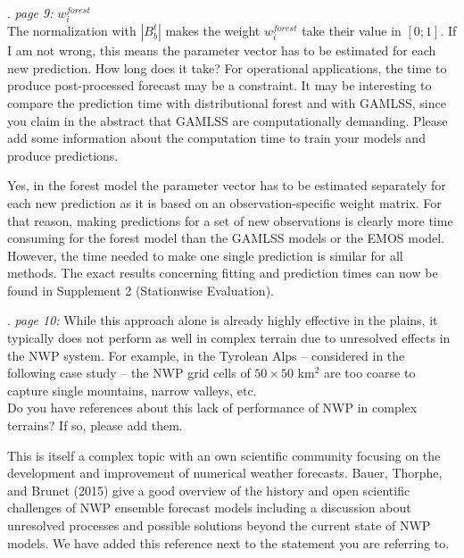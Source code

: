 \documentclass[american,foldmarks=false,noconfig]{uibklttr}
\newenvironment{review}{\fontshape{\itdefault}\fontseries{\bfdefault} \selectfont \smallskip}{\par}
\begin{document}
\begin{review}
10. {\color{quotecolor}\textit{page 9:} $w_i^{forest}$}\\
The normalization with $|B_b^t|$ makes the weight $w_i^{forest}$ 
take their value in $[0; 1]$. If I am not wrong, this means the 
parameter vector has to be estimated for each new prediction. 
How long does it take? For operational applications, the time 
to produce post-processed forecast may be a constraint. It may 
be interesting to compare the prediction time with distributional 
forest and with GAMLSS, since you claim in the abstract that
GAMLSS are computationally demanding. Please add some information
about the computation time to train your models and produce predictions.
\end{review}

Yes, in the forest model the parameter vector has to be estimated 
separately for each new prediction as it is based on an 
observation-specific weight matrix. For that reason, making 
predictions for a set of new observations is clearly more 
time consuming for the forest model than the GAMLSS models 
or the EMOS model. However, the time needed to make one single 
prediction is similar for all methods. The exact results 
concerning fitting and prediction times can now be found in
Supplement 2 (Stationwise Evaluation).


\begin{review}
11. {\color{quotecolor}\textit{page 10:} While this approach 
alone is already highly effective in the plains, it typically 
does not perform as well in complex terrain due to unresolved 
effects in the NWP system. For example, in the Tyrolean 
Alps -- considered in the following case study -- the NWP grid 
cells of $50 \times 50$ km$^2$ are too coarse to capture single 
mountains, narrow valleys, etc.}\\
Do you have references about this lack of performance of NWP 
in complex terrains? If so, please add them.
\end{review}


This is itself a complex topic with an own scientific community
focusing on the development and improvement of numerical weather
forecasts. Bauer, Thorphe, and Brunet (2015) give a good overview
of the history and open scientific challenges of NWP ensemble forecast
models including a discussion about unresolved processes and possible
solutions beyond the current state of NWP models.
We have added this reference next to the statement you are referring to.
\end{document}
